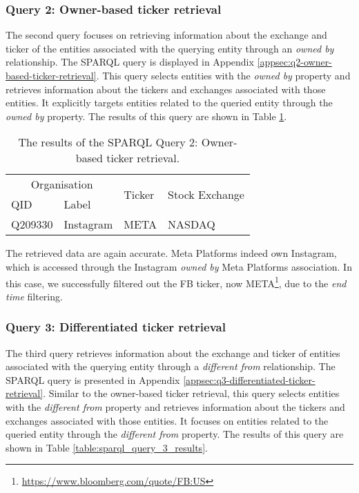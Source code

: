 {\subsubsection{Query 2: Owner-based ticker retrieval}
\label{subsubsec:q2-owner-based-ticker-retrieval}

The second query focuses on retrieving information about the exchange and ticker of the entities associated with the querying entity through an \textit{owned by} relationship. The SPARQL query is displayed in Appendix \ref{appsec:q2-owner-based-ticker-retrieval}. This query selects entities with the \textit{owned by} property and retrieves information about the tickers and exchanges associated with those entities. It explicitly targets entities related to the queried entity through the \textit{owned by} property. The results of this query are shown in Table \ref{table:sparql_query_2_results}.

\begin{table}[ht]
    \centering
    \caption{The results of the SPARQL Query 2: Owner-based ticker retrieval.}
    \label{table:sparql_query_2_results}
    \begin{tabular}{l l l l}
    \hline
    \multicolumn{2}{c}{Organisation} & \multirow{2}{*}{Ticker} & \multirow{2}{*}{Stock Exchange}\\
    \cline{1-2}
    QID & Label \\
    \hline
    Q209330 & Instagram & META & NASDAQ \\ \hline
    \end{tabular}
\end{table}

The retrieved data are again accurate. Meta Platforms indeed own Instagram, which is accessed through the Instagram \textit{owned by} Meta Platforms association. In this case, we successfully filtered out the FB ticker, now META\footnote{\href{https://www.bloomberg.com/quote/FB:US}{https://www.bloomberg.com/quote/FB:US}}, due to the \textit{end time} filtering.

\subsubsection{Query 3: Differentiated ticker retrieval}
\label{subsubsec:q3-differentiated-ticker-retrieval}
The third query retrieves information about the exchange and ticker of entities associated with the querying entity through a \textit{different from} relationship. The SPARQL query is presented in Appendix \ref{appsec:q3-differentiated-ticker-retrieval}. Similar to the owner-based ticker retrieval, this query selects entities with the \textit{different from} property and retrieves information about the tickers and exchanges associated with those entities. It focuses on entities related to the queried entity through the \textit{different from} property. The results of this query are shown in Table \ref{table:sparql_query_3_results}.

}

